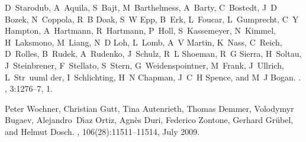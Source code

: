 \documentclass [11pt,fleqn]{article}
\begin{document}
\begin{thebibliography}{10}
D~Starodub, A~Aquila, S~Bajt, M~Barthelmess, A~Barty, C~Bostedt, J~D Bozek,
  N~Coppola, R~B Doak, S~W Epp, B~Erk, L~Foucar, L~Gumprecht, C~Y Hampton,
  A~Hartmann, R~Hartmann, P~Holl, S~Kassemeyer, N~Kimmel, H~Laksmono, M~Liang,
  N~D Loh, L~Lomb, A~V Martin, K~Nass, C~Reich, D~Rolles, B~Rudek, A~Rudenko,
  J~Schulz, R~L Shoeman, R~G Sierra, H~Soltau, J~Steinbrener, F~Stellato,
  S~Stern, G~Weidenspointner, M~Frank, J~Ullrich, L~Str~uuml der,
  I~Schlichting, H~N Chapman, J~C~H Spence, and M~J Bogan.
.
, 3:1276--7, 1.

Peter Wochner, Christian Gutt, Tina Autenrieth, Thomas Demmer, Volodymyr
  Bugaev, Alejandro~D{\'\i}az Ortiz, Agn{\`e}s Duri, Federico Zontone, Gerhard
  Gr{\"u}bel, and Helmut Dosch.
, 106(28):11511--11514, July 2009.

\end{thebibliography}

%
%
\end{document}
